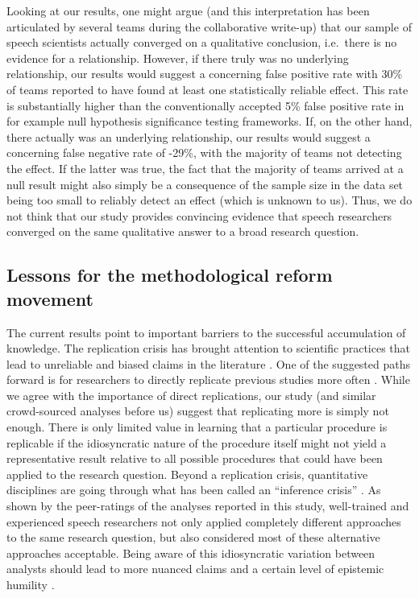 \documentclass[Review,times,sageh]{sagej}
\begin{document}
Looking at our results, one might argue (and this interpretation has been articulated by several teams during the collaborative write-up) that our sample of speech scientists actually converged on a qualitative conclusion, i.e.~there is no evidence for a relationship.
However, if there truly was no underlying relationship, our results would suggest a concerning false positive rate with 30\% of teams reported to have found at least one statistically reliable effect.
This rate is substantially higher than the conventionally accepted 5\% false positive rate in for example null hypothesis significance testing frameworks.
If, on the other hand, there actually was an underlying relationship, our results would suggest a concerning false negative rate of -29\%, with the majority of teams not detecting the effect.
If the latter was true, the fact that the majority of teams arrived at a null result might also simply be a consequence of the sample size in the data set being too small to reliably detect an effect (which is unknown to us).
Thus, we do not think that our study provides convincing evidence that speech researchers converged on the same qualitative answer to a broad research question.

\hypertarget{lessons-for-the-methodological-reform-movement}{%
\subsection{Lessons for the methodological reform movement}\label{lessons-for-the-methodological-reform-movement}}

The current results point to important barriers to the successful accumulation of knowledge.
The replication crisis has brought attention to scientific practices that lead to unreliable and biased claims in the literature \citep{vazire2017quality, fidler2018reproducibility}.
One of the suggested paths forward is for researchers to directly replicate previous studies more often \citep{open2015estimating, camerer2018evaluating}.
While we agree with the importance of direct replications, our study (and similar crowd-sourced analyses before us) suggest that replicating more is simply not enough.
There is only limited value in learning that a particular procedure is replicable if the idiosyncratic nature of the procedure itself might not yield a representative result relative to all possible procedures that could have been applied to the research question.
Beyond a replication crisis, quantitative disciplines are going through what has been called an ``inference crisis'' \citep{rotello2015more, starns2019assessing}.
As shown by the peer-ratings of the analyses reported in this study, well-trained and experienced speech researchers not only applied completely different approaches to the same research question, but also considered most of these alternative approaches acceptable.
Being aware of this idiosyncratic variation between analysts should lead to more nuanced claims and a certain level of epistemic humility \citep[see][ for an overview of the concept]{campbell1975}.
\end{document}

